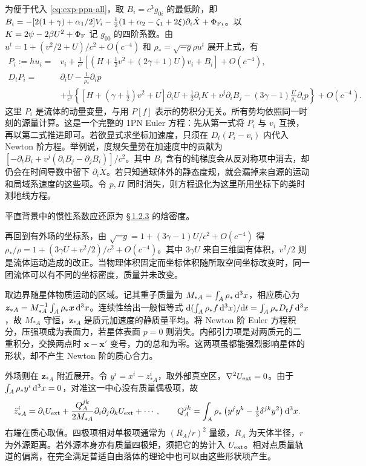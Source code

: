 为便于代入 \eqref{eq:exp-ppn-all}，取 $B_i=c^3g_{0i}$ 的最低阶，即
$B_i=-[2(1+\gamma)+\alpha_1/2]V_i-\tfrac12(1+\alpha_2-\zeta_1+2\xi)\partial_i\dot X+\Phi_{{\rm F}i}$。以 $K=2\psi-2\beta U^2+\Phi_{\rm F}$ 记 $g_{00}$ 的四阶系数。由 $u^t=1+(v^2/2+U)/c^2+O(c^{-4})$ 和 $\rho_*=\sqrt{-g}\rho u^t$ 展开上式，有
\begin{align}
 P_i:=hu_i={}&v_i+\frac{1}{c^2}
  \left[\left(H+\tfrac12v^2+(2\gamma+1)U\right)v_i+B_i\right]+O(c^{-4}),\nonumber\\
 D_tP_i={}&\partial_i U-\frac{1}{\rho_*}\partial_i p\nonumber\\
 &+\frac{1}{c^2}\left\{
   [H+(\gamma+\tfrac12)v^2+U]\partial_iU
       +\tfrac12\partial_iK+v^j\partial_iB_j
       -(3\gamma-1)\frac{U}{\rho_*}\partial_i p\right\}
       +O(c^{-4}).\label{eq:exp-fluid-p}
\end{align}
这里 $P_i$ 是流体的动量变量，与用 $P[f]$ 表示的势积分无关。所有势均依照同一时刻的源量计算。这是一个完整的 1PN Euler 方程：先从第一式将 $P_i$ 与 $v_i$ 互换，再以第二式推进即可。若欲显式求坐标加速度，只须在 $D_t(P_i-v_i)$ 内代入 Newton 阶方程。举例说，度规矢量势在加速度中的贡献为 $[-\partial_t B_i+v^j(\partial_i B_j-\partial_jB_i)]/c^2$。其中 $B_i$ 含有的纯梯度会从反对称项中消去，却仍会在时间导数中留下 $\partial_i\ddot X$。若只知道球体外的静态度规，就会漏掉来自源的运动和局域系速度的这些项。令 $p,\Pi$ 同时消失，则方程退化为这里所用坐标下的类时测地线方程。

平直背景中的惯性系数应还原为 \hyperlink{subsection.1.2.3}{\S\,1.2.3} 的焓密度。

再回到有外场的坐标系，由 $\sqrt{-g}=1+(3\gamma-1)U/c^2+O(c^{-4})$ 得 $\rho_*/\rho=1+(3\gamma U+v^2/2)/c^2+O(c^{-4})$。其中 $3\gamma U$ 来自三维固有体积，$v^2/2$ 则是流体运动造成的改正。当物理体积固定而坐标体积随所取空间坐标改变时，同一团流体可以有不同的坐标密度，质量并未改变。

取边界随星体物质运动的区域。记其重子质量为 $M_{*A}=\int_A\rho_*\,\dd^3x$，相应质心为 $\bm z_{*A}=M_{*A}^{-1}\int_A\rho_*\bm x\,\dd^3x$。连续性给出一般恒等式 $\mathrm d(\int_A\rho_*f\,\dd^3x)/\mathrm dt=\int_A\rho_*D_tf\,\dd^3x$，故 $M_{*A}$ 守恒，$\ddot{\bm z}_{*A}$ 是质元加速度的静质量平均。将 Newton 阶 Euler 方程积分，压强项成为表面力，若星体表面 $p=0$ 则消失。内部引力项是对两质元的二重积分，交换两点时 $\bm x-\bm x'$ 变号，力的总和为零。这两项虽都能强烈影响星体的形状，却不产生 Newton 阶的质心合力。

外场则在 $\bm z_{*A}$ 附近展开。令 $y^i=x^i-z_{*A}^i$，取外部真空区，$\nabla^2 U_{\rm ext}=0$。由于 $\int_A\rho_*y^i\,\dd^3x=0$，对准这一中心没有质量偶极项，故
\[
 \ddot z_{*A}^i=\partial_iU_{\rm ext}
   +\frac{Q_A^{jk}}{2M_{*A}}\partial_i\partial_j\partial_k U_{\rm ext}
   +\cdots,\qquad
 Q_A^{jk}=\int_A\rho_*\left(y^jy^k-\tfrac13\delta^{jk}y^2\right)\dd^3x .
\]
右端在质心取值。四极项相对单极项通常为 $(R_A/r)^2$ 量级，$R_A$ 为天体半径，$r$ 为外源距离。若外源本身亦有质量四极矩，须把它的势计入 $U_{\rm ext}$。相对点质量轨道的偏离，在完全满足普适自由落体的理论中也可以由这些形状项产生。

